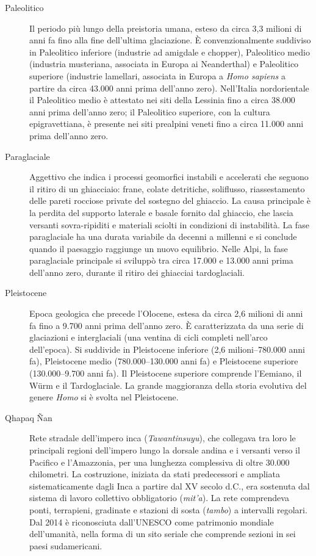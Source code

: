 \begin{description}
\item[Paleolitico] Il periodo più lungo della preistoria umana, esteso da circa 3,3 milioni di anni fa fino alla fine dell'ultima glaciazione. È convenzionalmente suddiviso in Paleolitico inferiore (industrie ad amigdale e chopper), Paleolitico medio (industria musteriana, associata in Europa ai Neanderthal) e Paleolitico superiore (industrie lamellari, associata in Europa a \textit{Homo sapiens} a partire da circa 43.000 anni prima dell'anno zero). Nell'Italia nordorientale il Paleolitico medio è attestato nei siti della Lessinia fino a circa 38.000 anni prima dell'anno zero; il Paleolitico superiore, con la cultura epigravettiana, è presente nei siti prealpini veneti fino a circa 11.000 anni prima dell'anno zero.

\item[Paraglaciale] Aggettivo che indica i processi geomorfici instabili e accelerati che seguono il ritiro di un ghiacciaio: frane, colate detritiche, soliflusso, riassestamento delle pareti rocciose private del sostegno del ghiaccio. La causa principale è la perdita del supporto laterale e basale fornito dal ghiaccio, che lascia versanti sovra-ripiditi e materiali sciolti in condizioni di instabilità. La fase paraglaciale ha una durata variabile da decenni a millenni e si conclude quando il paesaggio raggiunge un nuovo equilibrio. Nelle Alpi, la fase paraglaciale principale si sviluppò tra circa 17.000 e 13.000 anni prima dell'anno zero, durante il ritiro dei ghiacciai tardoglaciali.

\item[Pleistocene] Epoca geologica che precede l'Olocene, estesa da circa 2,6 milioni di anni fa fino a 9.700 anni prima dell'anno zero. È caratterizzata da una serie di glaciazioni e interglaciali (una ventina di cicli completi nell'arco dell'epoca). Si suddivide in Pleistocene inferiore (2,6 milioni--780.000 anni fa), Pleistocene medio (780.000--130.000 anni fa) e Pleistocene superiore (130.000--9.700 anni fa). Il Pleistocene superiore comprende l'Eemiano, il Würm e il Tardoglaciale. La grande maggioranza della storia evolutiva del genere \textit{Homo} si è svolta nel Pleistocene.

\item[Qhapaq Ñan] Rete stradale dell'impero inca (\textit{Tawantinsuyu}), che collegava tra loro le principali regioni dell'impero lungo la dorsale andina e i versanti verso il Pacifico e l'Amazzonia, per una lunghezza complessiva di oltre 30.000 chilometri. La costruzione, iniziata da stati predecessori e ampliata sistematicamente dagli Inca a partire dal XV secolo d.C., era sostenuta dal sistema di lavoro collettivo obbligatorio (\textit{mit'a}). La rete comprendeva ponti, terrapieni, gradinate e stazioni di sosta (\textit{tambo}) a intervalli regolari. Dal 2014 è riconosciuta dall'UNESCO come patrimonio mondiale dell'umanità, nella forma di un sito seriale che comprende sezioni in sei paesi sudamericani.


\end{description}
